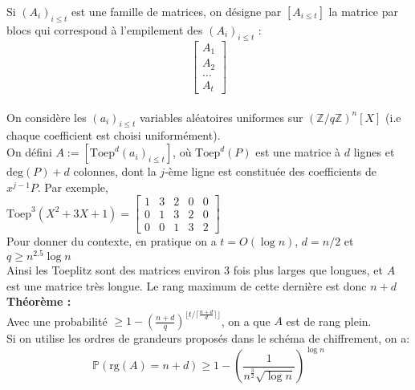 \documentclass[11pt,a4paper]{article}
\begin{document}
Si $(A_i)_{i \leq t}$ est une famille de matrices, on désigne par $[A_{i\leq t}]$ la matrice par blocs qui correspond à l'empilement des  $(A_i)_{i \leq t}$ : 
$$ \left[\begin{array}{c}
A_1 \\ A_2 \\ \dots \\ A_t
\end{array}\right] $$
 \\

On considère les $(a_i)_{i \leq t}$ variables aléatoires uniformes sur $(\mathbb{Z}/q\mathbb{Z})^n[X]$ (i.e chaque coefficient est choisi uniformément). \\

On défini $A:=[\text{Toep}^{d}(a_i)_{i\leq t}]$, où  $\text{Toep}^{d}(P)$ est une matrice à $d$ lignes et $\text{deg}(P)+d$ colonnes, dont la $j$-ème ligne est constituée des coefficients de $x^{j-1}P$. Par exemple, \\

$\text{Toep}^{3}(X^2 + 3X + 1) = \left[\begin{array}{ccccc}
1&3&2&0&0 \\
0&1&3&2&0 \\ 
0&0&1&3&2 
\end{array}\right]$ \\

Pour donner du contexte, en pratique on a $t=O(\log{n})$, $d=n/2$ et $q \geq n^{2.5}\log{n}$ \\
Ainsi les Toeplitz sont des matrices environ 3 fois plus larges que longues, et $A$ est une matrice très longue. Le rang maximum de cette dernière est donc $n+d$ \\


\textbf{Théorème : \\}
Avec une probabilité $\geq 1 - (\frac{n+d}{q})^{\lfloor t/\lceil\frac{n+d}{d}\rceil\rfloor}$, on a que $A$ est de rang plein. \\
Si on utilise les ordres de grandeurs proposés dans le schéma de chiffrement, on a:  \[\mathbb{P}(\text{rg}(A)=n+d) \geq 1 - (\frac{1}{n^\frac{3}{2}\sqrt{\log{n}}})^{\log{n}}\] \\
\end{document}
